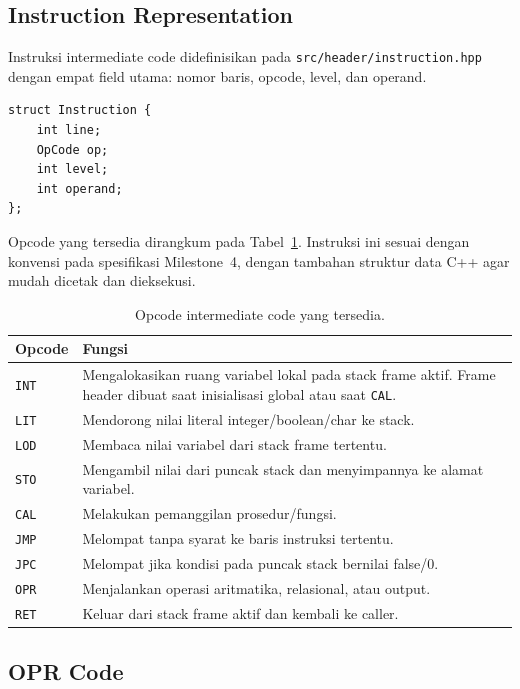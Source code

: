 \documentclass[11pt,a4paper]{article}
\begin{document}
\subsection{Instruction Representation}

Instruksi intermediate code didefinisikan pada \texttt{src/header/instruction.hpp}
dengan empat field utama: nomor baris, opcode, level, dan operand.

\begin{lstlisting}
struct Instruction {
    int line;
    OpCode op;
    int level;
    int operand;
};
\end{lstlisting}

Opcode yang tersedia dirangkum pada Tabel~\ref{tab:opcode}. Instruksi ini
sesuai dengan konvensi pada spesifikasi Milestone~4, dengan tambahan struktur
data C++ agar mudah dicetak dan dieksekusi.

\begin{table}[H]
\centering
\begin{tabularx}{\textwidth}{l X}
\toprule
\textbf{Opcode} & \textbf{Fungsi} \\
\midrule
\texttt{INT} & Mengalokasikan ruang variabel lokal pada stack frame aktif. Frame header dibuat saat inisialisasi global atau saat \texttt{CAL}. \\
\texttt{LIT} & Mendorong nilai literal integer/boolean/char ke stack. \\
\texttt{LOD} & Membaca nilai variabel dari stack frame tertentu. \\
\texttt{STO} & Mengambil nilai dari puncak stack dan menyimpannya ke alamat variabel. \\
\texttt{CAL} & Melakukan pemanggilan prosedur/fungsi. \\
\texttt{JMP} & Melompat tanpa syarat ke baris instruksi tertentu. \\
\texttt{JPC} & Melompat jika kondisi pada puncak stack bernilai false/0. \\
\texttt{OPR} & Menjalankan operasi aritmatika, relasional, atau output. \\
\texttt{RET} & Keluar dari stack frame aktif dan kembali ke caller. \\
\bottomrule
\end{tabularx}
\caption{Opcode intermediate code yang tersedia.}
\label{tab:opcode}
\end{table}

\subsection{OPR Code}
\end{document}
